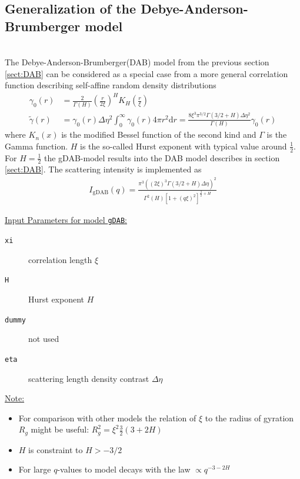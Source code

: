 \clearpage
\subsection{Generalization of the Debye-Anderson-Brumberger model}
\label{sect:gDAB}~\\
The Debye-Anderson-Brumberger(DAB) model from the previous section \ref{sect:DAB} can be considered as a special case from a more general correlation function describing self-affine random density distributions \cite{Klimes2002,Hunter2006,Andersson2008}
\begin{align}
\gamma_0(r) &=
\frac{2}{\Gamma(H)}\left(\frac{r}{2\xi}\right)^H K_H\left(\frac{r}{\xi}\right) \\
\tilde{\gamma}(r) &= \gamma_0(r) \Delta\eta^2 \int_0^\infty \gamma_0(r) 4\pi r^2 \mathrm{d}r = \frac{8\xi^3\pi^{3/2}\Gamma(3/2+H)\Delta\eta^2}{\Gamma(H)}\gamma_0(r)
\end{align}
where $K_n(x)$ is the modified Bessel function of the second kind
and $\Gamma$ is the Gamma function. $H$ is the so-called Hurst
exponent with typical value around $\frac12$. For $H=\frac12$ the gDAB-model results into the DAB model describes in section \ref{sect:DAB}. The scattering intensity is implemented as
\begin{align} \label{eq:gDAB}
I_\mathrm{gDAB}(q) =  \frac{\pi^3\left(\left(2\xi\right)^3\Gamma(3/2+H)\Delta\eta\right)^2}{\Gamma^2(H)\left[1+(q\xi)^2\right]^{\frac32+H}}
\end{align}


\uline{Input Parameters for model \texttt{gDAB}:}\\
\begin{description}
\item[\texttt{xi}] correlation length $\xi$
\item[\texttt{H}] Hurst exponent $H$
\item[\texttt{dummy}] not used
\item[\texttt{eta}] scattering length density contrast $\Delta\eta$
\end{description}

\uline{Note:}
\begin{itemize}
\item For comparison with other models the relation of $\xi$ to the radius of gyration $R_g$ might be useful: $R_g^2=\xi^2 \frac32 (3+2H)$
\item $H$ is constraint to $H>-3/2$
\item For large $q$-values to model decays with the law $\propto q^{-3-2H}$
\end{itemize}



